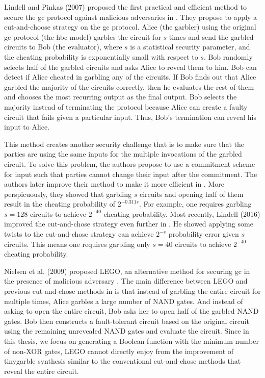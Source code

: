 Lindell and Pinkas (2007) proposed the first practical and efficient method to secure the \acrshort{gc} protocol against malicious adversaries in \cite{lindell2007efficient}.
They propose to apply a cut-and-choose strategy on the \acrshort{gc} protocol.
Alice (the garbler) using the original \acrshort{gc} protocol (the \acrshort{hbc} model) garbles the circuit for $s$ times and send the garbled circuits to Bob (the evaluator), where $s$ is a statistical security parameter, and the cheating probability is exponentially small with respect to $s$.
Bob randomly selects half of the garbled circuits and asks Alice to reveal them to him.
Bob can detect if Alice cheated in garbling any of the circuits.
If Bob finds out that Alice garbled the majority of the circuits correctly, then he evaluates the rest of them and chooses the most recurring output as the final output.
Bob selects the majority instead of terminating the protocol because Alice can create a faulty circuit that fails given a particular input. Thus, Bob's termination can reveal his input to Alice.

This method creates another security challenge that is to make sure that the parties are using the same inputs for the multiple invocations of the garbled circuit.
To solve this problem, the authors propose to use a commitment scheme for input such that parties cannot change their input after the commitment.
The authors later improve their method to make it more efficient in \cite{lindell2012secure}.
More perspicuously, they showed that garbling $s$ circuits and opening half of them result in the cheating probability of $2^{-0.311s}$.
For example, one requires garbling $s=128$ circuits to achieve $2^{-40}$ cheating probability.
Most recently, Lindell (2016) improved the cut-and-chose strategy even further in \cite{lindell2016fast}.
He showed applying some twists to the cut-and-chose strategy can achieve $2^{-s}$ probability error given $s$ circuits.
This means one requires garbling only $s=40$ circuits to achieve $2^{-40}$ cheating probability.

Nielsen et al. (2009) proposed LEGO, an alternative method for securing \acrshort{gc} in the presence of malicious adversary \cite{nielsen2009lego}.
The main difference between LEGO and previous cut-and-chose methods in \cite{lindell2007efficient, shen2011two, lindell2012secure, mohassel2013garbled, lindell2016fast} is that instead of garbling the entire circuit for multiple times, Alice garbles a large number of NAND gates.
And instead of asking to open the entire circuit, Bob asks her to open half of the garbled NAND gates.
Bob then constructs a fault-tolerant circuit based on the original circuit using the remaining unrevealed NAND gates and evaluate the circuit.
Since in this thesis, we focus on generating a Boolean function with the minimum number of non-XOR gates, LEGO cannot directly enjoy from the improvement of \gls{tinygarble} synthesis similar to the conventional cut-and-chose methods that reveal the entire circuit.

